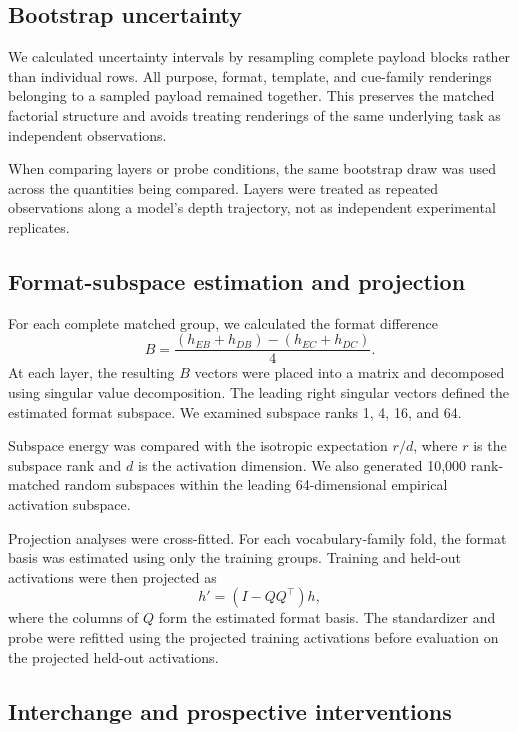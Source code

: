 \subsection{Bootstrap uncertainty}
\label{app:bootstrap}

We calculated uncertainty intervals by resampling complete payload
blocks rather than individual rows. All purpose, format, template, and
cue-family renderings belonging to a sampled payload remained together.
This preserves the matched factorial structure and avoids treating
renderings of the same underlying task as independent observations.

When comparing layers or probe conditions, the same bootstrap draw was
used across the quantities being compared. Layers were treated as
repeated observations along a model's depth trajectory, not as
independent experimental replicates.

\subsection{Format-subspace estimation and projection}
\label{app:subspace}

For each complete matched group, we calculated the format difference
\[
B =
\frac{
(h_{EB}+h_{DB})-(h_{EC}+h_{DC})
}{4}.
\]
At each layer, the resulting $B$ vectors were placed into a matrix and
decomposed using singular value decomposition. The leading right
singular vectors defined the estimated format subspace. We examined
subspace ranks 1, 4, 16, and 64.

Subspace energy was compared with the isotropic expectation $r/d$,
where $r$ is the subspace rank and $d$ is the activation dimension.
We also generated 10,000 rank-matched random subspaces within the
leading 64-dimensional empirical activation subspace.

Projection analyses were cross-fitted. For each vocabulary-family fold,
the format basis was estimated using only the training groups.
Training and held-out activations were then projected as
\[
h'=(I-QQ^\top)h,
\]
where the columns of $Q$ form the estimated format basis. The
standardizer and probe were refitted using the projected training
activations before evaluation on the projected held-out activations.

\subsection{Interchange and prospective interventions}
\label{app:interventions}

